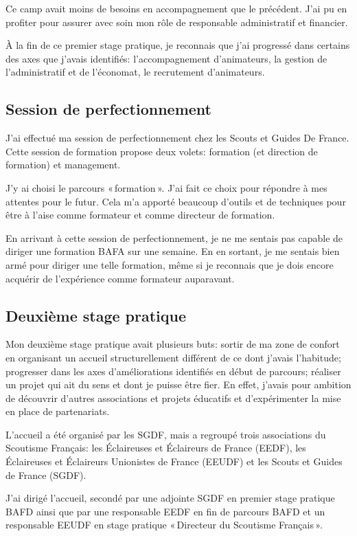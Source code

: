 \documentclass[titlepage,11pt,a4paper]{article}
\begin{document}
Ce camp avait moins de besoins en accompagnement que le précédent. J'ai pu en profiter
pour assurer avec soin mon rôle de responsable administratif et financier.

À la fin de ce premier stage pratique, je reconnais que j'ai progressé dans certains des
axes que j'avais identifiés: l'accompagnement d'animateurs, la gestion de l'administratif
et de l'économat, le recrutement d'animateurs.

\subsection{Session de perfectionnement}

J'ai effectué ma session de perfectionnement chez les Scouts et Guides De France.
Cette session de formation propose deux volets: formation (et direction de formation)
et management.

J'y ai choisi le parcours «\,formation\,». J'ai fait ce choix pour répondre à mes attentes
pour le futur. Cela m'a apporté beaucoup d'outils et de techniques pour être à l'aise
comme formateur et comme directeur de formation.

En arrivant à cette session de perfectionnement, je ne me sentais pas capable de diriger une
formation BAFA sur une semaine. En en sortant, je me sentais bien armé pour diriger une
telle formation, même si je reconnais que je dois encore acquérir de l'expérience comme
formateur auparavant.

\subsection{Deuxième stage pratique}

Mon deuxième stage pratique avait plusieurs buts: sortir de ma zone de confort en
organisant un accueil structurellement différent de ce dont j'avais l'habitude; progresser
dans les axes d'améliorations identifiés en début de parcours; réaliser un projet qui ait
du sens et dont je puisse être fier. En effet, j'avais pour ambition de découvrir
d'autres associations et projets éducatifs et d'expérimenter la mise en place de partenariats.

L'accueil a été organisé par les SGDF, mais a regroupé trois associations du Scoutisme
Français: les Éclaireuses et Éclaireurs de France (EEDF), les Éclaireuses et Éclaireurs
Unionistes de France (EEUDF) et les Scouts et Guides de France (SGDF).

J'ai dirigé l'accueil, secondé par une adjointe SGDF en premier stage pratique BAFD
ainsi que par une responsable EEDF en fin de parcours BAFD et un responsable
EEUDF en stage pratique «\,Directeur du Scoutisme Français\,».
\end{document}
